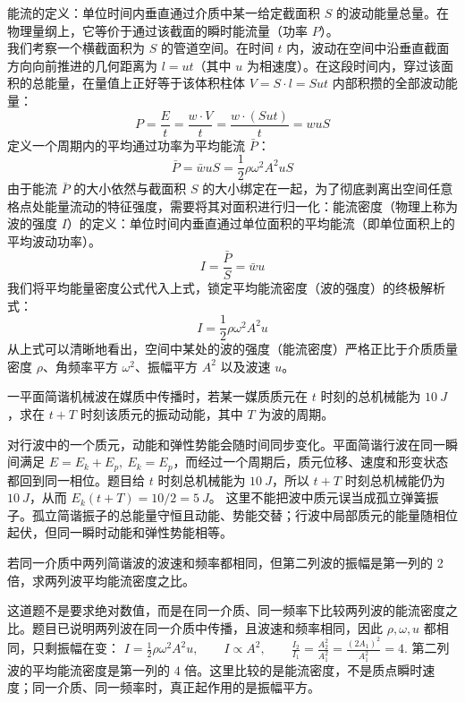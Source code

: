\documentclass[lang=cn,11pt]{elegantbook}
\begin{document}
\begin{definition}[能流和能流密度]
能流的定义：单位时间内垂直通过介质中某一给定截面积 $S$ 的波动能量总量。在物理量纲上，它等价于通过该截面的瞬时能流量（功率 $P$）。\\
我们考察一个横截面积为 $S$ 的管道空间。在时间 $t$ 内，波动在空间中沿垂直截面方向向前推进的几何距离为 $l = u t$（其中 $u$ 为相速度）。在这段时间内，穿过该面积的总能量，在量值上正好等于该体积柱体 $V = S \cdot l = S u t$ 内部积攒的全部波动能量：$$P = \frac{E}{t} = \frac{w \cdot V}{t} = \frac{w \cdot (S u t)}{t} = w u S$$定义一个周期内的平均通过功率为平均能流 $\bar{P}$：$$\boxed{\bar{P} = \bar{w} u S = \frac{1}{2} \rho \omega^2 A^2 u S}$$
由于能流 $\bar{P}$ 的大小依然与截面积 $S$ 的大小绑定在一起，为了彻底剥离出空间任意格点处能量流动的特征强度，需要将其对面积进行归一化：能流密度（物理上称为波的强度 $I$）的定义：单位时间内垂直通过单位面积的平均能流（即单位面积上的平均波动功率）。$$I = \frac{\bar{P}}{S} = \bar{w} u$$我们将平均能量密度公式代入上式，锁定平均能流密度（波的强度）的终极解析式：$$\boxed{I = \frac{1}{2} \rho \omega^2 A^2 u}$$从上式可以清晰地看出，空间中某处的波的强度（能流密度）严格正比于介质质量密度 $\rho$、角频率平方 $\omega^2$、振幅平方 $A^2$ 以及波速 $u$。
\end{definition}

\begin{exercise}
一平面简谐机械波在媒质中传播时，若某一媒质质元在 \(t\) 时刻的总机械能为 \(\SI{10}{J}\)，求在 \(t+T\) 时刻该质元的振动动能，其中 \(T\) 为波的周期。
\end{exercise}

\begin{solution}
对行波中的一个质元，动能和弹性势能会随时间同步变化。平面简谐行波在同一瞬间满足 \(E=E_k+E_p,\ E_k=E_p\)，而经过一个周期后，质元位移、速度和形变状态都回到同一相位。题目给 \(t\) 时刻总机械能为 \(\SI{10}{J}\)，所以 \(t+T\) 时刻总机械能仍为 \(\SI{10}{J}\)，从而 \(E_k(t+T)=10/2=\SI{5}{J}\)。
这里不能把波中质元误当成孤立弹簧振子。孤立简谐振子的总能量守恒且动能、势能交替；行波中局部质元的能量随相位起伏，但同一瞬时动能和弹性势能相等。
\end{solution}

\begin{exercise}[振幅加倍时能流密度怎样变]
若同一介质中两列简谐波的波速和频率都相同，但第二列波的振幅是第一列的 2 倍，求两列波平均能流密度之比。
\end{exercise}

\begin{solution}
这道题不是要求绝对数值，而是在同一介质、同一频率下比较两列波的能流密度之比。题目已说明两列波在同一介质中传播，且波速和频率相同，因此 \(\rho,\omega,u\) 都相同，只剩振幅在变：
 \(I=\frac{1}{2}\rho\omega^2A^2u,\qquad I\propto A^2,\qquad \frac{I_2}{I_1}=\frac{A_2^2}{A_1^2} =\frac{(2A_1)^2}{A_1^2}=4.\) 
第二列波的平均能流密度是第一列的 \(4\) 倍。这里比较的是能流密度，不是质点瞬时速度；同一介质、同一频率时，真正起作用的是振幅平方。
\end{solution}
\end{document}
